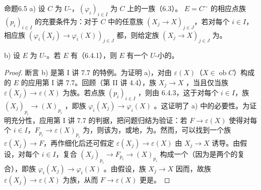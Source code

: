 \begin{SGAresult}{命题}{6.5}
 a) 设 $C$ 为 $U$-，$(\varphi_i)_{i\in I}$ 为 $C$ 上的一族（6.3）。 $E=C^\sim$ 的相应点族 $(p_i)_{i\in I}$ 的充要条件为：对于 $C$ 中的任意族 $(X_j\to X)_{j\in J}$，若对每个 $i\in I$，相应族 $(\varphi_i(X_j)\to\varphi_i(X))_{j\in J}$ 都，则给定族 $(X_j\to X)_{j\in J}$ 为。

 b) 设 $E$ 为 $U$-。若 $E$ 有（6.4.1），则 $E$ 有一个 $U$-小的。
\end{SGAresult}
\begin{proof}
断言 b) 是第 I 讲 7.7 的特例。为证明 a)，对由 $\varepsilon(X)$（$X\in\operatorname{ob}C$）构成的 $E$ 的应用第 I 讲 7.7。回顾（第 II 讲 4.4），族 $X_j\to X$ ，当且仅当族 $\varepsilon(X_j)\to\varepsilon(X)$ 为族。若点族 $(p_i)_{i\in I}$ ，则由 6.4.3，这于对每个 $i\in I$，族 $(X_j)_{p_i}\to(X)_{p_i}$ ，即族 $\varphi_i(X_j)\to\varphi_i(X)$ 。这证明了 a) 中的必要性。为证明充分性，应用第 I 讲 7.7 的判据，把问题归结为验证：若 $F\to\varepsilon(X)$ 使得对每个 $i\in I$，$F_{p_i}\to\varepsilon(X)_{p_i}$ 为，则该为，或地，为。然而，可以找到一个族 $\varepsilon(X_j)\to F$，再作细化后还可假定 $\varepsilon(X_j)\to\varepsilon(X)$ 由 $X_j\to X$ 诱导。由假设，对每个 $i\in I$，复合 $(X_j)_{p_i}\to F_{p_i}\to(X)_{p_i}$ 构成一个（因为是两个的复合），即族 $\varphi_i(X_j)\to\varphi_i(X)$ 。由假设，族 $X_j\to X$ 因而，故族 $\varepsilon(X_j)\to\varepsilon(X)$ 为族，从而 $F\to\varepsilon(X)$ 更是。
\end{proof}

